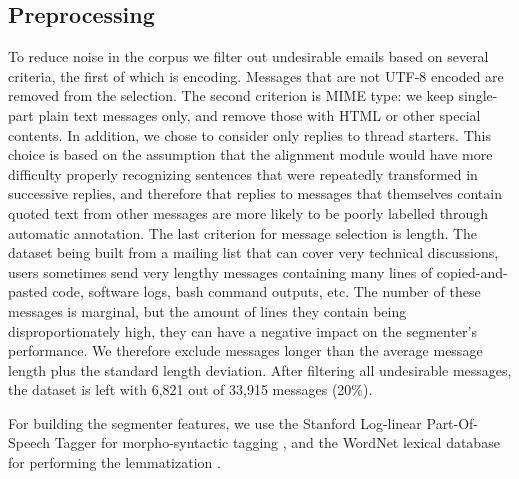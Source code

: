 \subsection{Preprocessing}

To reduce noise in the corpus we filter out undesirable emails based on several criteria, the first of which is encoding. Messages that are not UTF-8 encoded are removed from the selection. The second criterion is MIME type: we keep single-part plain text messages only, and remove those with HTML or other special contents.
%
In addition, we chose to consider only replies to thread starters. This choice is based on the assumption that the alignment module would have more difficulty properly recognizing sentences that were repeatedly transformed in successive replies, and therefore that replies to messages that themselves contain quoted text from other messages are more likely to be poorly labelled through automatic annotation.
%
The last criterion for message selection is length. The dataset being built from a mailing list that can cover very technical discussions, users sometimes send very lengthy messages containing many lines of copied-and-pasted code, software logs, bash command outputs, etc. The number of these messages is marginal, but the amount of lines they contain being disproportionately high, they can have a negative impact on the segmenter's performance. We therefore exclude messages longer than the average message length plus the standard length deviation.
%
After filtering all undesirable messages, the dataset is left with 6,821 out of 33,915 messages (20\%).

For building the segmenter features, we use the Stanford Log-linear Part-Of-Speech Tagger for morpho-syntactic tagging \cite{toutanova2003feature}, and the WordNet lexical database for performing the lemmatization \cite{miller1995wordnet}.

